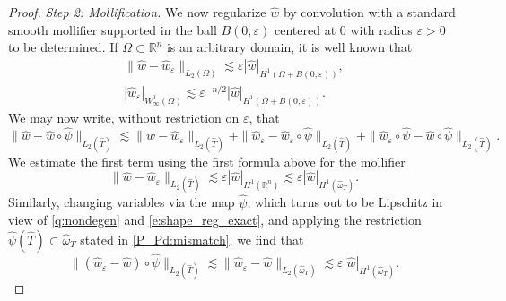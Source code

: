 \begin{proof}
\noindent
{\it Step 2: Mollification.}
We now regularize $\widehat{w}$ by convolution with a standard smooth mollifier
supported in the ball $B(0,\varepsilon)$ centered at $0$ with radius $\varepsilon>0$
to be determined. If $\Omega\subset\mathbb{R}^n$ is an arbitrary domain,
it is well known that
%
\begin{gather*}
\|\widehat{w}-\widehat{w}_\varepsilon\|_{L_2(\Omega)} \lesssim
\varepsilon |\widehat{w}|_{H^1(\Omega + B(0,\varepsilon))},
\\
|\widehat{w}_\varepsilon|_{W^1_\infty(\Omega)} \lesssim
\varepsilon^{-n/2} |\widehat{w}|_{H^1(\Omega + B(0,\varepsilon))}.
\end{gather*}
%
We may now write, without restriction on $\varepsilon$, that
%
\[
\|\widehat{w}-\widehat{w} \circ \widehat{\psi}\|_{L_2(\widehat{T})} \lesssim
\|\widehat{w}-\widehat{w}_\varepsilon\|_{L_2(\widehat{T})}
+ \|\widehat{w}_\varepsilon-\widehat{w}_\varepsilon \circ \widehat{\psi}\|_{L_2(\widehat{T})}
+ \|\widehat{w}_\varepsilon\circ \widehat{\psi}-\widehat{w} \circ \widehat{\psi}\|_{L_2(\widehat{T})}.
\]
%
We estimate the first term using the first formula above for the mollifier
%
\[
\|\widehat{w}-\widehat{w}_\varepsilon \|_{L_2(\widehat{T})} \lesssim
\varepsilon |\widehat{w}|_{H^1(\mathbb{R}^n)} \lesssim
\varepsilon |\widehat{w}|_{H^1(\widehat{\omega}_T)}.
\]
%
Similarly, changing variables via the map $\widehat\psi$, which turns out to be
Lipschitz in view of \eqref{q:nondegen} and \eqref{e:shape_reg_exact}, and
applying the restriction $\widehat{\psi}(\widehat{T}) \subset \widehat{\omega}_T$
stated in \eqref{P_Pd:mismatch}, we find that
%
\[
\|(\widehat{w}_\varepsilon -\widehat{w}) \circ \widehat{\psi}\|_{L_2(\widehat{T})} \lesssim
\|\widehat{w}_\varepsilon-\widehat{w}\|_{L_2(\widehat{\omega}_T)} \lesssim
\varepsilon |\widehat{w}|_{H^1(\widehat{\omega}_T)}.
\]


\end{proof}
